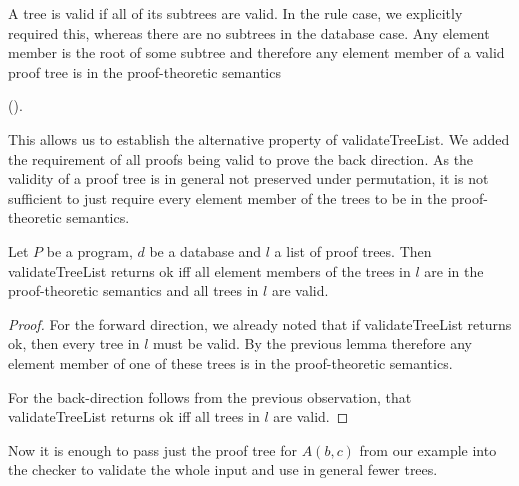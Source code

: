 A tree is valid if all of its subtrees are valid. In the rule case, we explicitly required this, whereas there are no subtrees in the database case. Any element member is the root of some subtree and therefore any element member of a valid proof tree is in the proof-theoretic semantics 

(\allTreeElementsOfValidTreeInSemantics).

This allows us to establish the alternative property of validateTreeList. We added the requirement of all proofs being valid to prove the back direction. As the validity of a proof tree is in general not preserved under permutation, it is not sufficient to just require every element member of the trees to be in the proof-theoretic semantics.

\begin{lemma}[\validateTreeListUnitIffSubsetSemanticsAndAllValid]
    Let $P$ be a program, $d$ be a database and $l$ a list of proof trees. Then validateTreeList returns ok iff all element members of the trees in $l$ are in the proof-theoretic semantics and all trees in $l$ are valid.
\end{lemma}
\begin{proof}
    For the forward direction, we already noted that if validateTreeList returns ok, then every tree in $l$ must be valid. By the previous lemma therefore any element member of one of these trees is in the proof-theoretic semantics.

    For the back-direction follows from the previous observation, that validateTreeList returns ok iff all trees in $l$ are valid.
\end{proof}

Now it is enough to pass just the proof tree for $A(b,c)$ from our example into the checker to validate the whole input and use in general fewer trees. 
